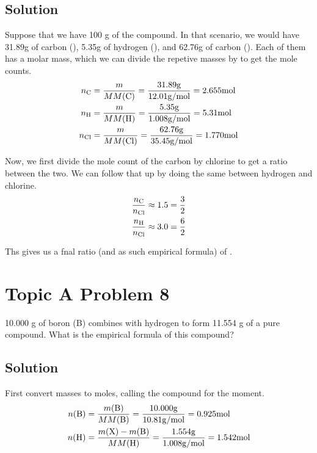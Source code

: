 \documentclass[10pt]{article}
\begin{document}
        \subsection{Solution}
            Suppose that we have 100 \unit{\gram} of the compound.
            In that scenario, we would have 31.89\unit{\gram} of carbon (), 5.35\unit{\gram} of hydrogen (), and 62.76\unit{\gram} of carbon (). 
            Each of them has a molar mass, which we can divide the repetive masses by to get the mole counts.
            \begin{align}
                n_{\ce{C}}  &=  \frac{m}{MM(\ce{C})}
                    =   \frac{31.89\unit{\gram}}{12.01 \unit{\gram/\mole}}
                    =   2.655 \unit{\mole}\\
                n_{\ce{H}}  &=  \frac{m}{MM(\ce{H})}
                    =   \frac{5.35\unit{\gram}}{1.008 \unit{\gram/\mole}}
                    =   5.31 \unit{\mole}\\
                n_{\ce{Cl}}  &=  \frac{m}{MM(\ce{Cl})}
                    =   \frac{62.76\unit{\gram}}{35.45 \unit{\gram/\mole}}
                    =   1.770 \unit{\mole}
            \end{align}

            Now, we first divide the mole count of the carbon by chlorine to get a ratio between the two.
            We can follow that up by doing the same between hydrogen and chlorine.
            \begin{align}
                \frac{n_{\ce{C}}}{n_{\ce{Cl}}}  &\approx    1.5 =   \frac{3}{2}\\
                \frac{n_{\ce{H}}}{n_{\ce{Cl}}}  &\approx    3.0 =   \frac{6}{2}
            \end{align}

            Ths gives us a fnal ratio (and as such empirical formula) of .

    \pagebreak
    \section{Topic A Problem 8}
        10.000 g of boron (B) combines with hydrogen to form 11.554 g of a pure compound. 
        What is the empirical formula of this compound?
            
        \subsection{Solution}
            First convert masses to moles, calling the compound  for the moment.
            \begin{align}
                n(\ce{B})   &=  \frac{m(\ce{B})}{MM(\ce{B})}
                    =   \frac{10.000 \unit{\gram}}{10.81 \unit{\gram/\mole}}
                    =   0.925 \unit{\mole}\\
                n(\ce{H})   &=  \frac{m(\ce{X}) - m(\ce{B})}{MM(\ce{H})}
                    =   \frac{1.554 \unit{\gram}}{1.008 \unit{\gram/\mole}}
                    =   1.542 \unit{\mole}
            \end{align}
\end{document}
